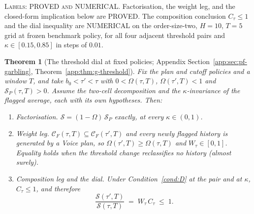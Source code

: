 \documentclass[11pt]{article}
\newtheorem{theorem}{Theorem}
\begin{document}
\noindent\textsc{Labels: PROVED and NUMERICAL.} Factorisation, the weight leg, and the closed-form
implication below are PROVED. The composition conclusion $C_\tau\leq1$ and the dial inequality
are NUMERICAL on the order-size-two, $H=10$, $T=5$ grid at frozen benchmark policy, for all four
adjacent threshold pairs and $\kappa\in[0.15,0.85]$ in steps of $0.01$.\par
\begin{theorem}[The threshold dial at fixed policies; Appendix Section~\ref{app:sec:pf-garbling}, Theorem~\ref{app:thm:g-threshold}]
\label{thm:threshold}
Fix the plan and cutoff policies and a window $T$, and take $b_0 < \tau' < \tau$ with
$0 < \Omega(\tau,T)$, $\Omega(\tau',T) < 1$ and $\mathcal S_P(\tau,T) > 0$. Assume the two-cell
decomposition and the $\kappa$-invariance of the flagged average, each with its own
hypotheses. Then:
\begin{enumerate}[label=(\Alph*),leftmargin=2.4em,itemsep=2pt]
\item \emph{Factorisation.} $\mathcal S = (1-\Omega)\,\mathcal S_P$ exactly, at every
  $\kappa \in (0,1)$.
\item \emph{Weight leg.} $\mathcal C_F(\tau,T) \subseteq \mathcal C_F(\tau',T)$ and every newly
  flagged history is generated by a Voice plan, so $\Omega(\tau',T)\geq\Omega(\tau,T)$ and
  $W_\tau\in[0,1]$. Equality holds when the threshold change reclassifies no history (almost surely).
\item \emph{Composition leg and the dial.} Under Condition~\ref{cond:D} at the pair and at
  $\kappa$, $C_\tau \le 1$, and therefore
  \begin{equation}
  \label{eq:threshold-dial}
  \frac{\mathcal S(\tau',T)}{\mathcal S(\tau,T)} \;=\; W_\tau\,C_\tau \;\le\; 1 .
  \end{equation}
\end{enumerate}
\end{theorem}
\end{document}
